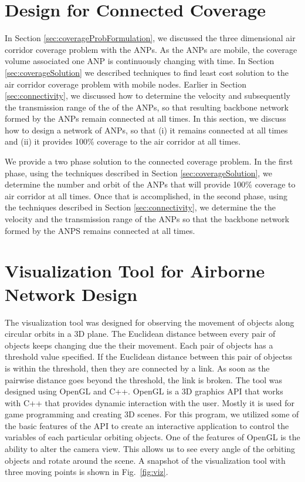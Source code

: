 \documentclass[10pt]{IEEEtran}
\begin{document}
\section{Design for Connected Coverage}
\label{sec:connCoverage}

In Section \ref{sec:coverageProbFormulation}, we discussed the three dimensional air corridor coverage problem with the ANPs. As the ANPs are mobile, the coverage volume associated one ANP is continuously changing with time. In Section \ref{sec:coverageSolution} we described techniques to find least cost solution to the air corridor coverage problem with mobile nodes. Earlier in Section \ref{sec:connectivity}, we discussed how to determine the velocity and subsequently the transmission range of the of the ANPs, so that resulting backbone network formed by the ANPs remain connected at all times. In this section, we discuss how to design a network of ANPs, so that (i) it remains connected at all times and (ii) it provides 100\% coverage to the air corridor at all times.

We provide a two phase solution to the connected coverage problem. In the first phase, using the techniques described in Section \ref{sec:coverageSolution}, we determine the number and orbit of the ANPs that will provide 100\% coverage to air corridor at all times. Once that is accomplished, in the second phase, using the techniques described in Section \ref{sec:connectivity}, we determine the the velocity and the transmission range of the ANPs so that  the backbone network formed by the ANPS remains connected at all times. 

\section{Visualization Tool for Airborne Network Design}
\label{sec:visualization}
The visualization tool was designed for observing the movement of objects along circular orbits in a 3D plane. The Euclidean distance between every pair of objects keeps changing due the their movement. Each pair of objects has a threshold value specified. If the Euclidean distance between this pair of objectss is within the threshold, then they are connected by a link. As soon as the pairwise distance goes beyond the threshold, the link is broken. The tool was designed using OpenGL and C++. OpenGL is a 3D graphics API that works with C++ that provides dynamic interaction with the user. Mostly it is used for game programming and creating 3D scenes. For this program, we utilized some of the basic features of the API to create an interactive application to control the variables of each particular orbiting objects. One of the features of OpenGL is the ability to alter the camera view. This allows us to see every angle of the orbiting objects and rotate around the scene. A snapshot of the visualization tool with three moving points is shown in Fig.~\ref{fig:viz}.
\end{document}
